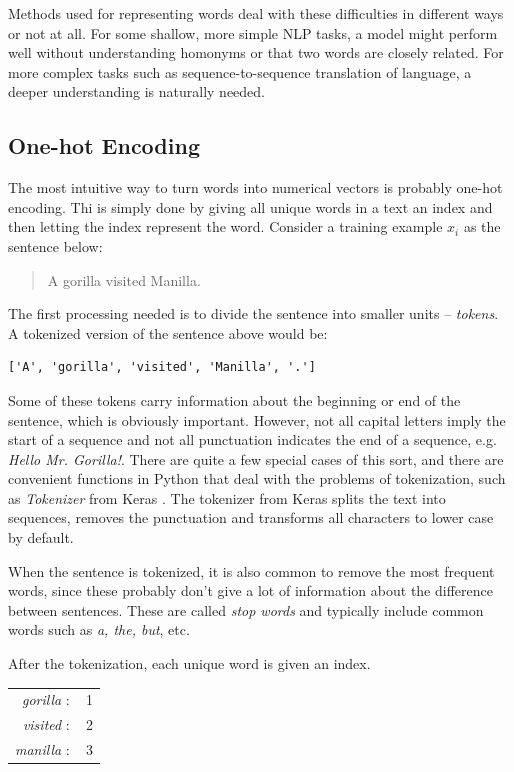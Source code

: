 Methods used for representing words deal with these difficulties in different ways or not at all. For some shallow, more simple NLP tasks, a model might perform well without understanding homonyms or that two words are closely related. For more complex tasks such as sequence-to-sequence translation of language, a deeper understanding is naturally needed.

\subsection{One-hot Encoding}
The most intuitive way to turn words into numerical vectors is probably one-hot encoding. Thi is simply done by giving all unique words in a text an index and then letting the index represent the word. Consider a training example $x_i$ as the sentence below:

\begin{quote}
A gorilla visited Manilla.
\end{quote}

The first processing needed is to divide the sentence into smaller units -- \emph{tokens}. A tokenized version of the sentence above would be:
\begin{verbatim}
['A', 'gorilla', 'visited', 'Manilla', '.']
\end{verbatim}

Some of these tokens carry information about the beginning or end of the sentence, which is obviously important. However, not all capital letters imply the start of a sequence and not all punctuation indicates the end of a sequence, e.g. \textit{Hello Mr. Gorilla!}. There are quite a few special cases of this sort, and there are convenient functions in Python that deal with the problems of tokenization, such as \textit{Tokenizer} from Keras \citep{chollet2020keras}. The tokenizer from Keras splits the text into sequences, removes the punctuation and transforms all characters to lower case by default. 

When the sentence is tokenized, it is also common to remove the most frequent words, since these probably don't give a lot of information about the difference between sentences. These are called \textit{stop words} and typically include common words such as \textit{a, the, but}, etc.

After the tokenization, each unique word is given an index. 
\begin{center}
    \begin{tabular}{rc}
        \textit{gorilla} $:$ & 1 \\
        \textit{visited} $:$ & 2 \\
        \textit{manilla} $:$ & 3 \\
    \end{tabular}
\end{center}

